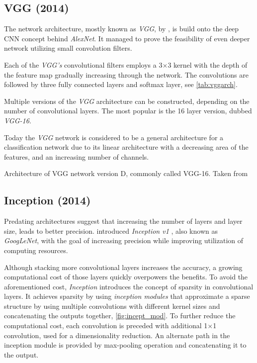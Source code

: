 \subsection{VGG (2014)}
\label{sec:VGG}
The network architecture, mostly known as \textit{VGG}, by \citeauthor{bib:vgg} \cite{bib:vgg}, is build onto the deep CNN concept behind \textit{AlexNet}. It managed to prove the feasibility of even deeper network utilizing small convolution filters. 

Each of the \textit{VGG's} convolutional filters employs a 3$\times$3 kernel with the depth of the feature map gradually increasing through the network. The convolutions are followed by three fully connected layers and softmax layer, see \cref{tab:vggarch}. 

Multiple versions of the \textit{VGG} architecture can be constructed, depending on the number of convolutional layers. The most popular is the 16 layer version, dubbed \textit{VGG-16}.

Today the \textit{VGG} network is considered to be a general architecture for a classification network due to its linear architecture with a decreasing area of the features, and an increasing number of channels. 

\begin{table}
    \centering
    \caption{Architecture of VGG network version D, commonly called VGG-16. Taken from \cite[table 1]{bib:vgg}}
    \label{tab:vggarch}
\end{table}
    
\subsection{Inception (2014)}
\label{sec:inception}
Predating architectures suggest that increasing the number of layers and layer size, leads to better precision. \citeauthor{bib:googlenet} introduced \textit{Inception v1} \cite{bib:googlenet}, also known as \textit{GoogLeNet}, with the goal of increasing precision while improving utilization of computing resources.

Although stacking more convolutional layers increases the accuracy, a growing computational cost of those layers quickly overpowers the benefits. To avoid the aforementioned cost, \textit{Inception} introduces the concept of sparsity in convolutional layers. It achieves sparsity by using \textit{inception modules} that approximate a sparse structure by using multiple convolutions with different kernel sizes and concatenating the outputs together, \cref{fig:incept_mod}. To further reduce the computational cost, each convolution is preceded with additional 1$\times$1 convolution, used for a dimensionality reduction. An alternate path in the inception module is provided by max-pooling operation and concatenating it to the output.

